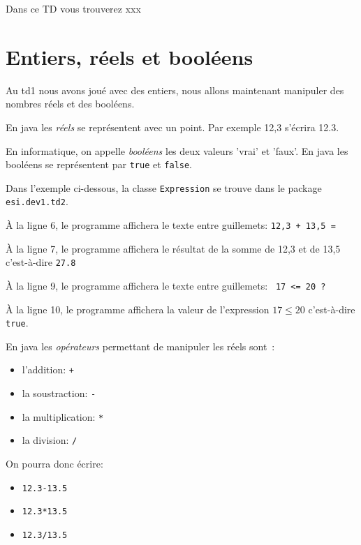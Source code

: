 \documentclass[a4paper,11pt]{article}
\begin{document}
	\logo
	\entete
	\licence
	\lastedit
	\maketitle
	\setcounter{tocdepth}{3}

	Dans ce TD vous trouverez xxx
	\tableofcontents

	\newpage

\section{Entiers, réels et booléens}


	Au td1 nous avons joué avec des entiers, nous allons maintenant 
	manipuler des nombres réels et des booléens.

	En java les \emph{réels} se représentent avec un point. 
	Par exemple 12,3 s'écrira 12.3.

	En informatique, on appelle \emph{booléens} les deux valeurs 'vrai' et 'faux'. 
	En java les booléens se représentent par \texttt{true} et \texttt{false}.  
 
	Dans l'exemple ci-dessous, la classe \texttt{Expression} se trouve dans le package 
	\texttt{esi.dev1.td2}.


	\`A la ligne 6, le programme affichera le texte entre guillemets: \texttt{12,3 + 13,5 =}

	\`A la ligne 7, le programme affichera le résultat de la somme de 12,3 et de 13,5 c'est-à-dire
	\texttt{27.8}

	\`A la ligne 9, le programme affichera le texte entre guillemets: \texttt{ 17 <= 20 ?}

	\`A la ligne 10, le programme affichera la valeur de l'expression $17\leq 20$ c'est-à-dire \texttt{true}.


	En java les \emph{opérateurs} permettant de manipuler les réels sont~:
	\begin{itemize}
		\item l'addition: \texttt{+}
		\item la soustraction: \texttt{-}
		\item la multiplication: \texttt{*}
		\item la division: \texttt{/}
	\end{itemize} 

	On pourra donc écrire: 
	\begin{itemize}
		\item \texttt{12.3-13.5}
		\item \texttt{12.3*13.5}
		\item \texttt{12.3/13.5}
	\end{itemize}
\end{document}
